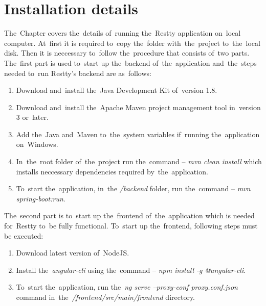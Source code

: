 

\chapter{Installation details}
The~Chapter covers the~details of~running the~Restty application on~local computer. At~first it is required to~copy the~folder
with~the~project to~the~local disk. Then it is neccessary to~follow the~procedure that consists of~two parts. 
The~first part is used to~start up the~backend of~the~application and~the~steps needed to~run Restty's backend are as~follows:

\begin{enumerate}
  \item Download and~install the~Java Development Kit of~version 1.8.
  \item Download and~install the~Apache Maven project management tool in~version 3 or~later.
  \item Add the~Java and~Maven to~the~system variables if~running the~application on~Windows.
  \item In~the~root folder of~the~project run the~command -- \textit{mvn clean install} which installs
		neccessary dependencies required by~the~application.
  \item To~start the~application, in~the \textit{/backend} folder, run the~command -- \textit{mvn spring-boot:run}. 
\end{enumerate}

The~second part is to~start up the~frontend of~the~application which is needed for~Restty to~be fully functional.
To~start up the~frontend, following steps must be executed:

\begin{enumerate}
  \item Download latest version of~NodeJS.
  \item Install the~\textit{angular-cli} using the~command -- \textit{npm install -g @angular-cli}.
  \item To~start the~application, run the~\textit{ng serve --proxy-conf proxy.conf.json} command
  	 	in~the~\textit{/frontend/src/main/frontend} directory. 
\end{enumerate}
